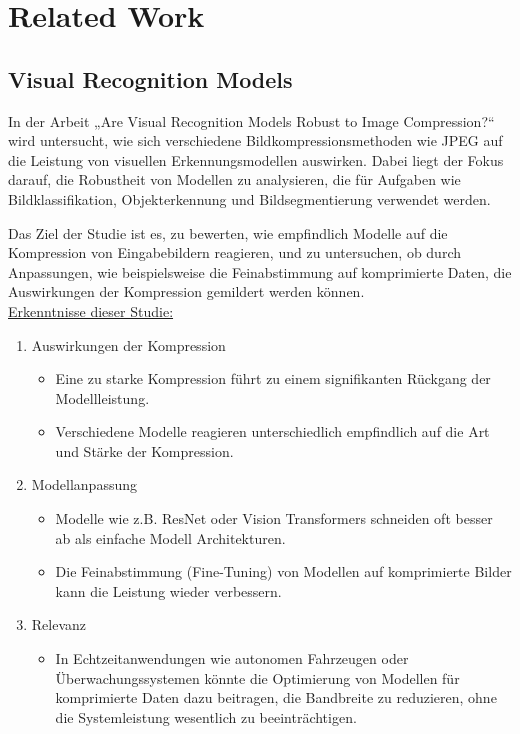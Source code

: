 \chapter{Related Work}
    \section{Visual Recognition Models}
        \cite{visual_recognition_models_paper} In der Arbeit „Are Visual Recognition Models Robust to Image Compression?“ wird untersucht, 
        wie sich verschiedene Bildkompressionsmethoden wie JPEG auf die Leistung von visuellen Erkennungsmodellen auswirken. Dabei liegt der Fokus darauf, die Robustheit von Modellen zu analysieren, die für Aufgaben wie Bildklassifikation, Objekterkennung und Bildsegmentierung verwendet werden.

        Das Ziel der Studie ist es, zu bewerten, wie empfindlich Modelle auf die Kompression von Eingabebildern reagieren, und zu untersuchen, ob durch Anpassungen, wie beispielsweise die Feinabstimmung auf komprimierte Daten, die Auswirkungen der Kompression gemildert werden können.\\

        \underline{Erkenntnisse dieser Studie:}
        \begin{enumerate}
            \item Auswirkungen der Kompression
            \begin{itemize}
                \item Eine zu starke Kompression führt zu einem signifikanten Rückgang der Modellleistung.
                \item Verschiedene Modelle reagieren unterschiedlich empfindlich auf die Art und Stärke der Kompression.
            \end{itemize}
            \item Modellanpassung
            \begin{itemize}
                \item Modelle wie z.B. ResNet oder Vision Transformers schneiden oft besser ab als einfache Modell Architekturen.
                \item Die Feinabstimmung (Fine-Tuning) von Modellen auf komprimierte Bilder kann die Leistung wieder verbessern.
            \end{itemize}
            \item Relevanz
            \begin{itemize}
                \item In Echtzeitanwendungen wie autonomen Fahrzeugen oder\\
                Überwachungssystemen könnte die Optimierung von Modellen für komprimierte Daten dazu beitragen, die Bandbreite zu reduzieren, ohne die Systemleistung wesentlich zu beeinträchtigen.
            \end{itemize}
        \end{enumerate}      

